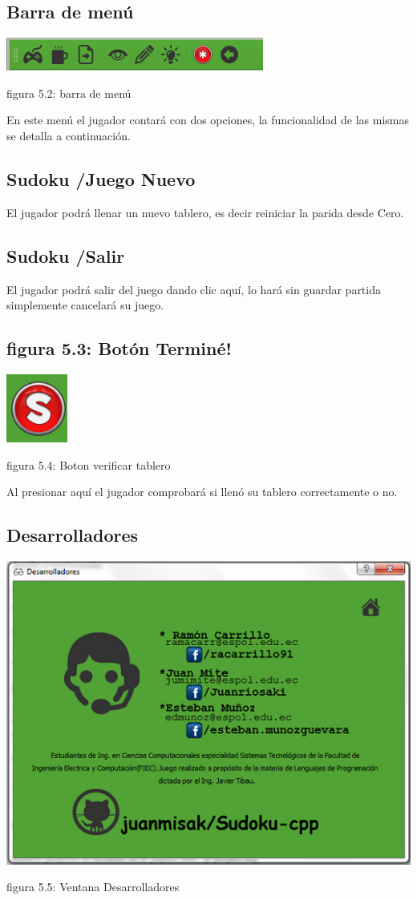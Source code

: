 \documentclass[a4paper,11pt]{article}
\begin{document}
{{\subsection{Barra de menú}

\centerline{\includegraphics{barra.png}}
\centerline{figura 5.2: barra de menú}

En este menú el jugador contará con dos opciones, la funcionalidad de las mismas se detalla a continuación.
\subsection{Sudoku /Juego Nuevo}
El jugador podrá llenar un nuevo tablero, es decir reiniciar la parida desde Cero.
\subsection{Sudoku /Salir}
El jugador podrá salir del juego dando clic aquí, lo hará sin guardar partida simplemente cancelará su juego.
\subsection{figura 5.3: Botón Terminé!}

\centerline{\includegraphics{termine.png}}
\centerline{figura 5.4: Boton verificar tablero}

Al presionar aquí el jugador comprobará si llenó su tablero correctamente o no.
\subsection{Desarrolladores}

\centerline{\includegraphics{pagdesa.png}}
\centerline{figura 5.5: Ventana Desarrolladores}

}}
\end{document}
